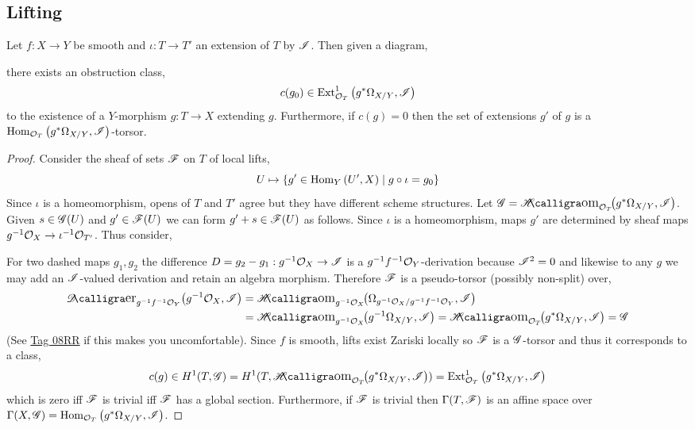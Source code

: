 \documentclass[12pt]{article}
\begin{document}
\subsection{Lifting}

\begin{prop}
Let $f : X \to Y$ be smooth and $\iota : T \to T'$ an extension of $T$ by $\mathscr{I}$. Then given a diagram,
\begin{center}
\end{center}
there exists an obstruction class,
\[ c(g_0) \in \mathrm{Ext}^{1}_{\mathcal{O}_{T}} \left( g^* \Omega_{X/Y}, \mathscr{I} \right) \]
to the existence of a $Y$-morphism $g : T \to X$ extending $g$. Furthermore, if $c(g) = 0$ then the set of extensions $g'$ of $g$ is a $\mathrm{Hom}_{\mathcal{O}_{T}} \left( g^* \Omega_{X/Y}, \mathscr{I} \right)$-torsor.
\end{prop}

\begin{proof}
Consider the sheaf of sets $\mathscr{F}$ on $T$ of local lifts,
\[ U \mapsto \{ g' \in \mathrm{Hom}_{Y} \left( U', X \right) \mid g \circ \iota = g_0 \} \]
Since $\iota$ is a homeomorphism, opens of $T$ and $T'$ agree but they have different scheme structures. Let $\G = \shHom{\struct{T}}{g^* \Omega_{X/Y}}{\I}$. Given $s \in \mathscr{G}(U)$ and $g' \in \mathscr{F}(U)$ we can form $g' + s \in \mathscr{F}(U)$ as follows. Since $\iota$ is a homeomorphism, maps $g'$ are determined by sheaf maps $g^{-1} \mathcal{O}_{X} \to \iota^{-1} \mathcal{O}_{T'}$. Thus consider,
\begin{center}
\end{center}
For two dashed maps $g_1, g_2$ the difference $D = g_2 - g_1 : g^{-1}\mathcal{O}_{X} \to \mathscr{I}$ is a $g^{-1} f^{-1} \mathcal{O}_{Y}$-derivation because $\mathscr{I}^2 = 0$ and likewise to any $g$ we may add an $\mathscr{I}$-valued derivation and retain an algebra morphism. Therefore $\mathscr{F}$ is a pseudo-torsor (possibly non-split) over,
\begin{align*}
\shDero{g^{-1} f^{-1} \struct{Y}}{g^{-1} \struct{X}}{\I} & = \shHom{g^{-1} \struct{X}}{\Omega_{g^{-1} \struct{X}/g^{-1} f^{-1} \struct{Y}}}{\I} 
\\
& = \shHom{g^{-1} \struct{X}}{g^{-1} \Omega_{X/Y}}{\I} = \shHom{\struct{T}}{g^* \Omega_{X/Y}}{\I} = \G
\end{align*}
(See \href{https://stacks.math.columbia.edu/tag/08RR}{Tag 08RR}  if this makes you uncomfortable).
Since $f$ is smooth, lifts exist Zariski locally so $\mathscr{F}$ is a $\mathscr{G}$-torsor and thus it corresponds to a class,
\[ c(g) \in H^1(T, \G) = H^1(T, \shHom{\struct{T}}{g^* \Omega_{X/Y}}{\I}) = \Ext{1}{\struct{T}}{g^* \Omega_{X/Y}}{\I} \]
which is zero iff $\mathscr{F}$ is trivial iff $\mathscr{F}$ has a global section. Furthermore, if $\mathscr{F}$ is trivial then $\Gamma(T, \mathscr{F})$ is an affine space over $\Gamma(X, \mathscr{G}) = \mathrm{Hom}_{\mathcal{O}_{T}} \left( g^* \Omega_{X/Y}, \mathscr{I} \right)$.
\end{proof}
\end{document}
